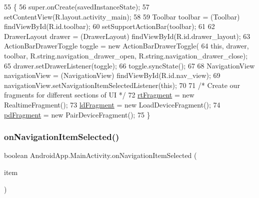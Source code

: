 \begin{DoxyCode}
55                                                        \{
56         super.onCreate(savedInstanceState);
57         setContentView(R.layout.activity\_main);
58 
59         Toolbar toolbar = (Toolbar) findViewById(R.id.toolbar);
60         setSupportActionBar(toolbar);
61 
62         DrawerLayout drawer = (DrawerLayout) findViewById(R.id.drawer\_layout);
63         ActionBarDrawerToggle toggle = \textcolor{keyword}{new} ActionBarDrawerToggle(
64                 \textcolor{keyword}{this}, drawer, toolbar, R.string.navigation\_drawer\_open, R.string.navigation\_drawer\_close);
65         drawer.setDrawerListener(toggle);
66         toggle.syncState();
67 
68         NavigationView navigationView = (NavigationView) findViewById(R.id.nav\_view);
69         navigationView.setNavigationItemSelectedListener(\textcolor{keyword}{this});
70 
71         \textcolor{comment}{/* Create our fragments for different sections of UI */}
72         \hyperlink{class_android_app_1_1_main_activity_ad0c2b20cf0204ef3b8ad00596870e9a1}{rtFragment} = \textcolor{keyword}{new} RealtimeFragment();
73         \hyperlink{class_android_app_1_1_main_activity_ad54c7414ab4cb86c81e79f2f0037c694}{ldFragment} = \textcolor{keyword}{new} LoadDeviceFragment();
74         \hyperlink{class_android_app_1_1_main_activity_a6dea684256a0cd0f73f87546ec2b0de2}{pdFragment} = \textcolor{keyword}{new} PairDeviceFragment();
75     \}
\end{DoxyCode}
\mbox{\label{class_android_app_1_1_main_activity_a260151867f535b62a2a926c270a2dbb8}} 
\subsubsection{\texorpdfstring{on\+Navigation\+Item\+Selected()}{onNavigationItemSelected()}}
{\footnotesize\ttfamily boolean Android\+App.\+Main\+Activity.\+on\+Navigation\+Item\+Selected (\begin{DoxyParamCaption}\item[{Menu\+Item}]{item }\end{DoxyParamCaption})\hspace{0.3cm}{\ttfamily [inline]}}



